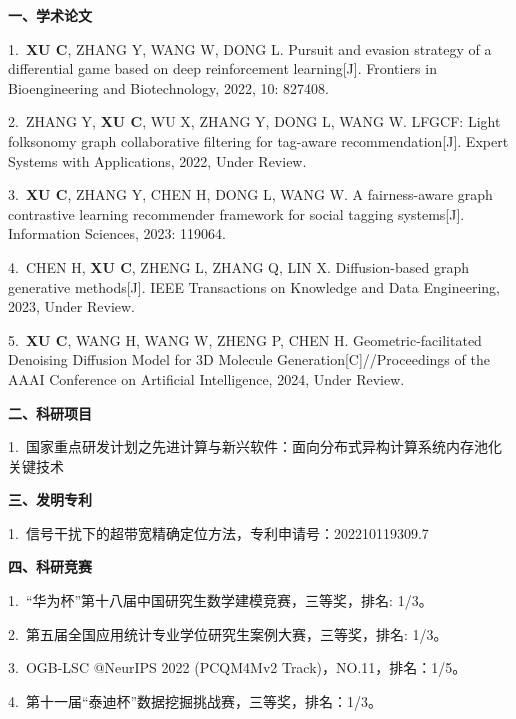 \cleardoublepage
{}

\noindent {}
\vskip 10pt

\vskip 5pt
\noindent \textbf{一、学术论文}
\vskip 5pt 

1.~\textbf{XU C}, ZHANG Y, WANG W, DONG L. Pursuit and evasion strategy of a differential game based on deep reinforcement learning[J]. Frontiers in Bioengineering and Biotechnology, 2022, 10: 827408.

2.~ZHANG Y, \textbf{XU C}, WU X, ZHANG Y, DONG L, WANG W. LFGCF: Light folksonomy graph collaborative filtering for tag-aware recommendation[J]. Expert Systems with Applications, 2022, Under Review.

3.~\textbf{XU C}, ZHANG Y, CHEN H, DONG L, WANG W. A fairness-aware graph contrastive learning recommender framework for social tagging systems[J]. Information Sciences, 2023: 119064.

4.~CHEN H, \textbf{XU C}, ZHENG L, ZHANG Q, LIN X. Diffusion-based graph generative methods[J]. IEEE Transactions on Knowledge and Data Engineering, 2023, Under Review.

5.~\textbf{XU C}, WANG H, WANG W, ZHENG P, CHEN H. Geometric-facilitated Denoising Diffusion Model for 3D Molecule Generation[C]//Proceedings of the AAAI Conference on Artificial Intelligence, 2024, Under Review.

\vskip 5pt 
\noindent \textbf{二、科研项目}
\vskip 5pt 

1.~国家重点研发计划之先进计算与新兴软件：面向分布式异构计算系统内存池化关键技术




\vskip 5pt 
\noindent \textbf{三、发明专利}
\vskip 5pt 

1.~信号干扰下的超带宽精确定位方法，专利申请号：202210119309.7

\vskip 5pt 
\noindent \textbf{四、科研竞赛}
\vskip 5pt 

1.~“华为杯”第十八届中国研究生数学建模竞赛，三等奖，排名: 1/3。

2.~第五届全国应用统计专业学位研究生案例大赛，三等奖，排名: 1/3。

3.~OGB-LSC @NeurIPS 2022 (PCQM4Mv2 Track)，NO.11，排名：1/5。

4.~第十一届“泰迪杯”数据挖掘挑战赛，三等奖，排名：1/3。
\newpage